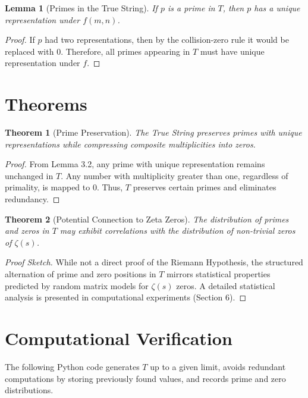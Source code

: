 \documentclass[12pt]{article}
\newtheorem{theorem}{Theorem}[section]
\newtheorem{lemma}{Lemma}[section]
\begin{document}
\begin{lemma}[Primes in the True String]
If $p$ is a prime in $T$, then $p$ has a unique representation under $f(m,n)$.
\end{lemma}
\begin{proof}
If $p$ had two representations, then by the collision-zero rule it would be replaced with $0$. Therefore, all primes appearing in $T$ must have unique representation under $f$.  
\end{proof}

\section{Theorems}
\begin{theorem}[Prime Preservation]
The True String preserves primes with unique representations while compressing composite multiplicities into zeros.
\end{theorem}
\begin{proof}
From Lemma 3.2, any prime with unique representation remains unchanged in $T$. Any number with multiplicity greater than one, regardless of primality, is mapped to $0$. Thus, $T$ preserves certain primes and eliminates redundancy.
\end{proof}

\begin{theorem}[Potential Connection to Zeta Zeros]
The distribution of primes and zeros in $T$ may exhibit correlations with the distribution of non-trivial zeros of $\zeta(s)$.
\end{theorem}
\begin{proof}[Proof Sketch]
While not a direct proof of the Riemann Hypothesis, the structured alternation of prime and zero positions in $T$ mirrors statistical properties predicted by random matrix models for $\zeta(s)$ zeros. A detailed statistical analysis is presented in computational experiments (Section 6).
\end{proof}

\section{Computational Verification}
The following Python code generates $T$ up to a given limit, avoids redundant computations by storing previously found values, and records prime and zero distributions.
\end{document}

